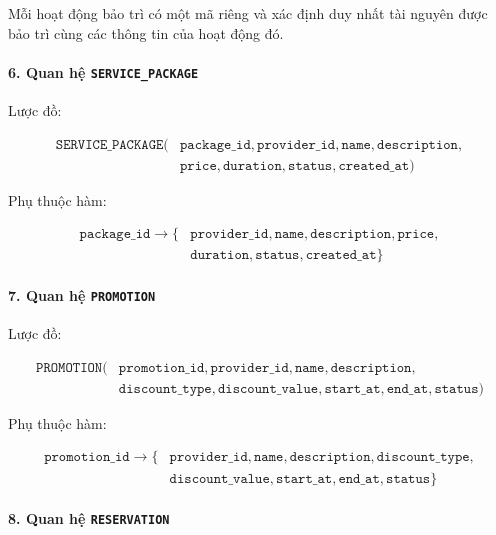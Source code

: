 Mỗi hoạt động bảo trì có một mã riêng và xác định duy nhất tài nguyên được bảo trì cùng các thông tin của hoạt động đó.

\paragraph{6. Quan hệ \texttt{SERVICE\_PACKAGE}}\mbox{}\par

Lược đồ:

$$
\begin{aligned}
\texttt{SERVICE\_PACKAGE}( & \texttt{package\_id}, \texttt{provider\_id}, \texttt{name}, \texttt{description}, \\
& \texttt{price}, \texttt{duration}, \texttt{status}, \texttt{created\_at} )
\end{aligned}
$$

Phụ thuộc hàm:

$$
\begin{aligned}
\texttt{package\_id} \rightarrow \{ & \texttt{provider\_id}, \texttt{name}, \texttt{description}, \texttt{price}, \\
& \texttt{duration}, \texttt{status}, \texttt{created\_at} \}
\end{aligned}
$$

\paragraph{7. Quan hệ \texttt{PROMOTION}}\mbox{}\par

Lược đồ:

$$
\begin{aligned}
\texttt{PROMOTION}( & \texttt{promotion\_id}, \texttt{provider\_id}, \texttt{name}, \texttt{description}, \\
& \texttt{discount\_type}, \texttt{discount\_value}, \texttt{start\_at}, \texttt{end\_at}, \texttt{status} )
\end{aligned}
$$

Phụ thuộc hàm:

$$
\begin{aligned}
\texttt{promotion\_id} \rightarrow \{ & \texttt{provider\_id}, \texttt{name}, \texttt{description}, \texttt{discount\_type}, \\
& \texttt{discount\_value}, \texttt{start\_at}, \texttt{end\_at}, \texttt{status} \}
\end{aligned}
$$

\paragraph{8. Quan hệ \texttt{RESERVATION}}\mbox{}\par

